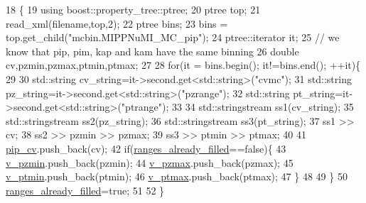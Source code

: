 \begin{DoxyCode}
18                                                       \{
19     \textcolor{keyword}{using} boost::property\_tree::ptree;
20     ptree top;
21     read\_xml(filename,top,2); 
22     ptree bins;
23     bins = top.get\_child(\textcolor{stringliteral}{"mcbin.MIPPNuMI\_MC\_pip"});
24     ptree::iterator it;    
25     \textcolor{comment}{// we know that pip, pim, kap and kam have the same binning}
26     \textcolor{keywordtype}{double} cv,pzmin,pzmax,ptmin,ptmax;
27     
28     \textcolor{keywordflow}{for}(it = bins.begin(); it!=bins.end(); ++it)\{
29    
30       std::string cv\_string=it->second.get<std::string>(\textcolor{stringliteral}{"cvmc"});
31       std::string pz\_string=it->second.get<std::string>(\textcolor{stringliteral}{"pzrange"});
32       std::string pt\_string=it->second.get<std::string>(\textcolor{stringliteral}{"ptrange"});
33 
34       std::stringstream ss1(cv\_string);
35       std::stringstream ss2(pz\_string);
36       std::stringstream ss3(pt\_string);
37       ss1 >> cv;
38       ss2 >> pzmin >> pzmax;
39       ss3 >> ptmin >> ptmax;
40    
41       \hyperlink{class_neutrino_flux_reweight_1_1_m_i_p_p_numi_m_c_ad6ca50dd6ef1c900ff6f0b53858a13fe}{pip\_cv}.push\_back(cv);
42       \textcolor{keywordflow}{if}(\hyperlink{class_neutrino_flux_reweight_1_1_m_i_p_p_numi_m_c_a13918556257e6e07eb9c83cb9c029a94}{ranges\_already\_filled}==\textcolor{keyword}{false})\{
43         \hyperlink{class_neutrino_flux_reweight_1_1_m_i_p_p_numi_m_c_af6796ed5716ee06589ab1ba6e09fcd82}{v\_pzmin}.push\_back(pzmin);
44         \hyperlink{class_neutrino_flux_reweight_1_1_m_i_p_p_numi_m_c_ac4e9e478e2456cd112522650850b507c}{v\_pzmax}.push\_back(pzmax);
45         \hyperlink{class_neutrino_flux_reweight_1_1_m_i_p_p_numi_m_c_a105e858db8bf5e6b94a69b196815d98a}{v\_ptmin}.push\_back(ptmin);
46         \hyperlink{class_neutrino_flux_reweight_1_1_m_i_p_p_numi_m_c_afab2e17efd7d42565f3e1c8a84064349}{v\_ptmax}.push\_back(ptmax);
47       \}
48       
49     \}
50     \hyperlink{class_neutrino_flux_reweight_1_1_m_i_p_p_numi_m_c_a13918556257e6e07eb9c83cb9c029a94}{ranges\_already\_filled}=\textcolor{keyword}{true};
51     
52   \}
\end{DoxyCode}


